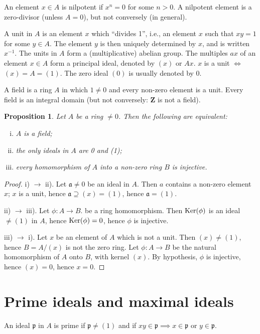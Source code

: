 \documentclass[class=book, crop=false]{standalone}
\newtheorem{proposition}[theorem]{Proposition}
\theoremstyle{definition}
\theoremstyle{remark}
\begin{document}
An element $x \in A$ is nilpotent if $x^{n}=0$ for some $n>0$. A nilpotent
element is a zero-divisor (unless $A=0$), but not conversely (in general).

A unit in $A$ is an element $x$ which ``divides 1'', i.e., an element $x$ such
that $x y=1$ for some $y \in A$. The element $y$ is then uniquely determined by
$x$, and is written $x^{-1}$. The units in $A$ form a (multiplicative) abelian
group. The multiples $a x$ of an element $x \in A$ form a principal ideal,
denoted by $(x)$ or $A x$. $x$ is a unit $\iff$ $(x)=A=(1)$. The zero ideal
$(0)$ is usually denoted by $0$.

A field is a ring $A$ in which $1 \neq 0$ and every non-zero element is a unit.
Every field is an integral domain (but not conversely: $\mathbf{Z}$ is not a
field).

\begin{proposition}
  Let $A$ be a ring $\neq 0$. Then the following are equivalent:
  \begin{enumerate}[i)]
    \item $A$ is a field;
    \item the only ideals in $A$ are 0 and (1);
    \item every homomorphism of $A$ into a non-zero ring $B$ is injective.
  \end{enumerate}
\end{proposition}
\begin{proof}
  i) $\to$ ii). Let $\mathfrak{a} \neq 0$ be an ideal in $A$. Then $a$ contains
  a non-zero element $x$; $x$ is a unit, hence $\mathfrak{a} \supseteq(x)=(1)$,
  hence $\mathfrak{a}=(1)$.

  ii) $\to$ iii). Let $\phi: A \to B$. be a ring homomorphism. Then
  $\operatorname{Ker}(\phi)$ is an ideal $\neq(1)$ in $A$, hence
  $\operatorname{Ker}(\phi)=0$, hence $\phi$ is injective.

  iii) $\to$ i). Let $x$ be an element of $A$ which is not a unit. Then
  $(x) \neq(1)$, hence $B=A /(x)$ is not the zero ring. Let $\phi: A \to B$ be
  the natural homomorphism of $A$ onto $B$, with kernel $(x)$. By hypothesis,
  $\phi$ is injective, hence $(x)=0$, hence $x=0$.
\end{proof}
\section{Prime ideals and maximal ideals}
An ideal $\mathfrak{p}$ in $A$ is prime if $\mathfrak{p} \neq(1)$ and if
$x y \in \mathfrak{p} \implies x \in \mathfrak{p}$ or $y \in \mathfrak{p}$.
\end{document}
